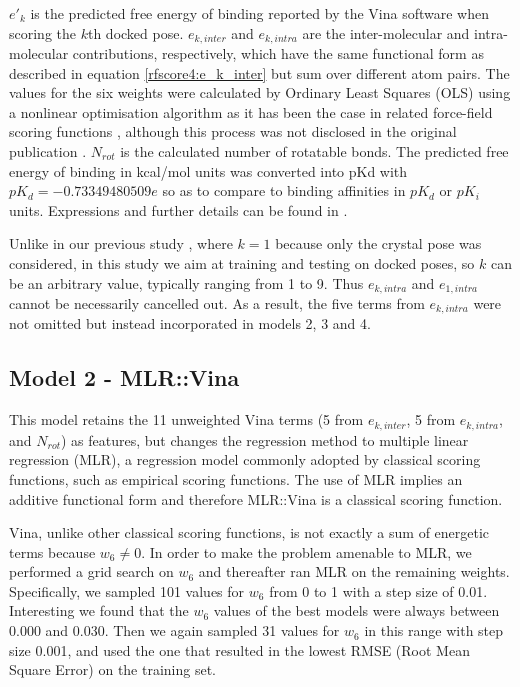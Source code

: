 \documentclass[twocolumn]{bmcart}
\begin{document}
$e'_k$ is the predicted free energy of binding reported by the Vina software when scoring the $k$th docked pose. $e_{k,inter}$ and $e_{k,intra}$ are the inter-molecular and intra-molecular contributions, respectively, which have the same functional form as described in equation \ref{rfscore4:e_k_inter} but sum over different atom pairs. The values for the six weights were calculated by Ordinary Least Squares (OLS) using a nonlinear optimisation algorithm as it has been the case in related force-field scoring functions \cite{1454}, although this process was not disclosed in the original publication \cite{595}. $N_{rot}$ is the calculated number of rotatable bonds. The predicted free energy of binding in kcal/mol units was converted into pKd with $pK_d=-0.73349480509e$ so as to compare to binding affinities in $pK_d$ or $pK_i$ units. Expressions and further details can be found in \cite{1362}.

Unlike in our previous study \cite{1647}, where $k=1$ because only the crystal pose was considered, in this study we aim at training and testing on docked poses, so $k$ can be an arbitrary value, typically ranging from 1 to 9. Thus $e_{k,intra}$ and $e_{1,intra}$ cannot be necessarily cancelled out. As a result, the five terms from $e_{k,intra}$ were not omitted but instead incorporated in models 2, 3 and 4.

\subsection*{Model 2 - MLR::Vina}

This model retains the 11 unweighted Vina terms (5 from $e_{k,inter}$, 5 from $e_{k,intra}$, and $N_{rot}$) as features, but changes the regression method to multiple linear regression (MLR), a regression model commonly adopted by classical scoring functions, such as empirical scoring functions. The use of MLR implies an additive functional form and therefore MLR::Vina is a classical scoring function.

Vina, unlike other classical scoring functions, is not exactly a sum of energetic terms because $w_6\neq0$. In order to make the problem amenable to MLR, we performed a grid search on $w_6$ and thereafter ran MLR on the remaining weights. Specifically, we sampled 101 values for $w_6$ from 0 to 1 with a step size of 0.01. Interesting we found that the $w_6$ values of the best models were always between 0.000 and 0.030. Then we again sampled 31 values for $w_6$ in this range with step size 0.001, and used the one that resulted in the lowest RMSE (Root Mean Square Error) on the training set.
\end{document}
